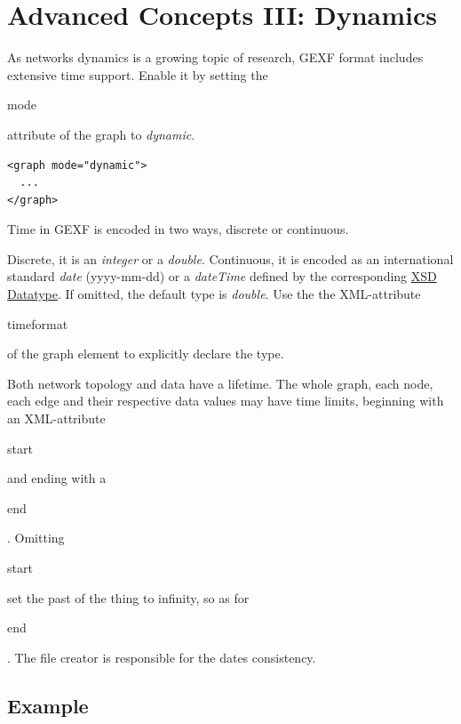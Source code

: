 \documentclass[a4paper,10pt]{article}
\begin{document}
\section{Advanced Concepts III: Dynamics} \label{dynamics}

As networks dynamics is a growing topic of research, GEXF format includes extensive time support. Enable it by setting the \begin{footnotesize}mode\end{footnotesize} attribute of the graph to \textit{dynamic}.

\lstset{ style=gexf }
\begin{lstlisting}[caption={Dynamic Enabled!},label=dynamicEnabled]
<graph mode="dynamic">
  ...
</graph>
\end{lstlisting}

Time in GEXF is encoded in two ways, discrete or continuous.

Discrete, it is an \textit{integer} or a \textit{double}. Continuous, it is encoded as an international standard \textit{date} (yyyy-mm-dd) or a \textit{dateTime} defined by the corresponding \href{http://www.w3.org/TR/xmlschema-2/#dateTime}{XSD Datatype}. If omitted, the default type is \textit{double}. Use the the XML-attribute \begin{footnotesize}timeformat\end{footnotesize} of the graph element to explicitly declare the type.

Both network topology and data have a lifetime. The whole graph, each node, each edge and their respective data values may have time limits, beginning with an XML-attribute \begin{footnotesize}start\end{footnotesize} and ending with a \begin{footnotesize}end\end{footnotesize}. Omitting \begin{footnotesize}start\end{footnotesize} set the past of the thing to infinity, so as for \begin{footnotesize}end\end{footnotesize}. The file creator is responsible for the dates consistency.


\subsection{Example}
\end{document}
